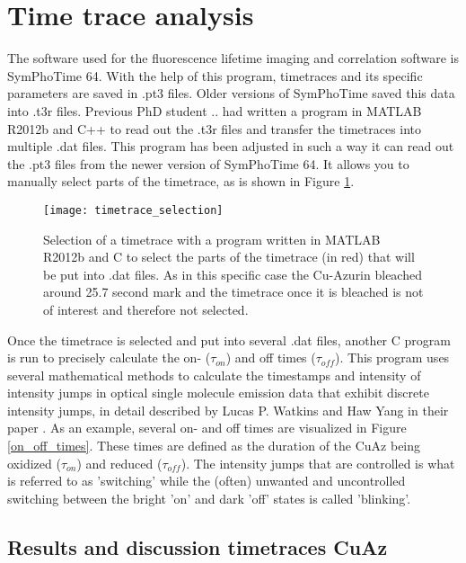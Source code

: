 \documentclass[twoside,single]{lion-msc}
\begin{document}
\section*{Time trace analysis}
The software used for the fluorescence lifetime imaging and correlation software is SymPhoTime 64. With the help of this program, timetraces and its specific parameters are saved in .pt3 files. Older versions of SymPhoTime saved this data into .t3r files. Previous PhD student .. had written a program in MATLAB R2012b and C++ to read out the .t3r files and transfer the timetraces into multiple .dat files. This program has been adjusted in such a way it can read out the .pt3 files from the newer version of SymPhoTime 64. It allows you to manually select parts of the timetrace, as is shown in Figure \ref{timetrace_selection}.

\begin{figure}[ht!]
\centering
\texttt{[image: timetrace\_selection]}
\caption{Selection of a timetrace with a program written in MATLAB R2012b and C to select the parts of the timetrace (in red) that will be put into .dat files. As in this specific case the Cu-Azurin bleached around 25.7 second mark and the timetrace once it is bleached is not of interest and therefore not selected.}
\label{timetrace_selection}
\end{figure}

Once the timetrace is selected and put into several .dat files, another C program is run to precisely calculate the  on- ($\tau_{on}$) and off times ($\tau_{off}$). This program uses several mathematical methods to calculate the timestamps and intensity of intensity jumps in optical single molecule emission data that exhibit discrete intensity jumps, in detail described by Lucas P. Watkins and Haw Yang in their paper \cite{And2004}. As an example, several on- and off times are visualized in Figure \ref{on_off_times}. These times are defined as the duration of the CuAz being oxidized ($\tau_{on}$) and reduced ($\tau_{off}$). The intensity jumps that are controlled is what is referred to as 'switching' while the (often) unwanted and uncontrolled switching between the bright 'on' and dark 'off' states is called 'blinking'. 

\subsection*{Results and discussion timetraces CuAz}
\end{document}
